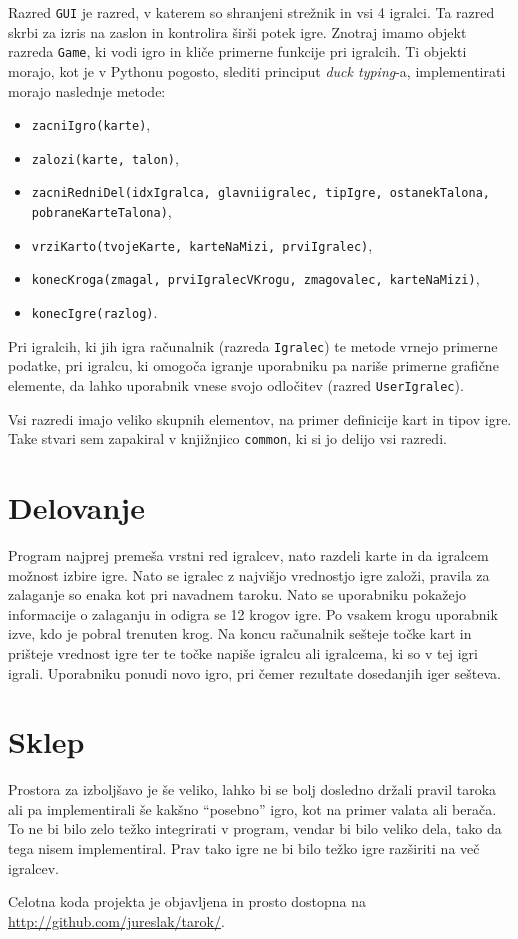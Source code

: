 \documentclass{article}
\begin{document}
Razred \texttt{GUI} je razred, v katerem so shranjeni strežnik in vsi 4 igralci. Ta razred skrbi za izris na zaslon in kontrolira širši potek igre. Znotraj imamo objekt razreda \texttt{Game}, ki vodi igro in kliče primerne funkcije pri igralcih. Ti objekti morajo, kot je v Pythonu pogosto, slediti principut \emph{duck typing}-a, implementirati morajo naslednje metode:
\begin{itemize}
  \item \texttt{zacniIgro(karte)},
  \item \texttt{zalozi(karte, talon)},
  \item \texttt{zacniRedniDel(idxIgralca, glavniigralec, tipIgre, ostanekTalona, pobraneKarteTalona)},
  \item \texttt{vrziKarto(tvojeKarte, karteNaMizi, prviIgralec)},
  \item \texttt{konecKroga(zmagal, prviIgralecVKrogu, zmagovalec, karteNaMizi)},
  \item \texttt{konecIgre(razlog)}.
\end{itemize}
Pri igralcih, ki jih igra računalnik (razreda \texttt{Igralec}) te metode vrnejo primerne podatke, pri igralcu, ki omogoča igranje uporabniku pa nariše primerne grafične elemente, da lahko uporabnik vnese svojo odločitev (razred \texttt{UserIgralec}).

Vsi razredi imajo veliko skupnih elementov, na primer definicije kart in tipov igre. Take stvari sem zapakiral v knjižnjico \texttt{common}, ki  si jo delijo vsi razredi.


\section{Delovanje}
Program najprej premeša vrstni red igralcev, nato razdeli karte in da igralcem možnost izbire igre. Nato se igralec z najvišjo vrednostjo igre založi, 
pravila za zalaganje so enaka kot pri navadnem taroku. Nato se uporabniku pokažejo informacije o zalaganju in odigra se 12 krogov igre. Po vsakem krogu uporabnik izve, kdo je pobral trenuten krog. Na koncu računalnik sešteje točke kart in prišteje vrednost igre ter te točke napiše igralcu ali igralcema, ki so v tej igri igrali. Uporabniku ponudi novo igro, pri čemer rezultate dosedanjih iger sešteva.

\section{Sklep}
Prostora za izboljšavo je še veliko, lahko bi se bolj dosledno držali pravil taroka ali pa implementirali še kakšno ``posebno'' igro, kot na primer valata ali berača.
To ne bi bilo zelo težko integrirati v program, vendar bi bilo veliko dela, tako da tega nisem implementiral. Prav tako igre ne bi bilo težko igre razširiti na več igralcev.

Celotna koda projekta je objavljena in prosto dostopna na \url{http://github.com/jureslak/tarok/}.
\end{document}
